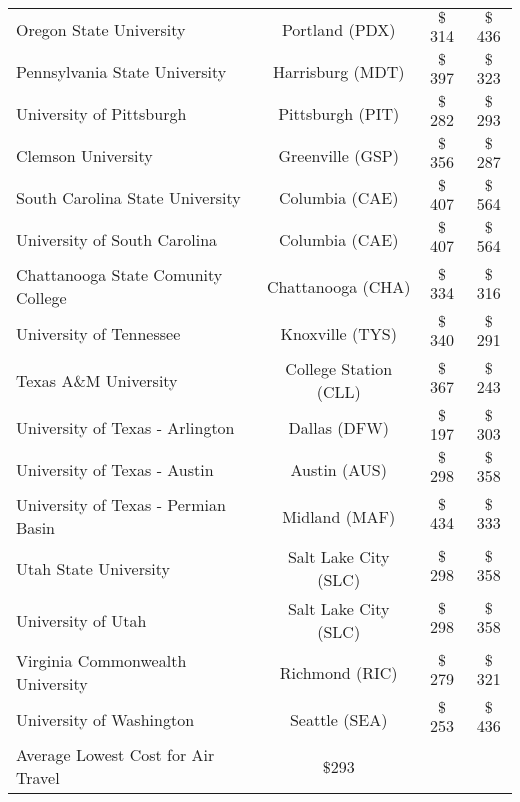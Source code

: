 \begin{center}
\begin{tabular}{lccc}
    Oregon State University &Portland (PDX) &$\$$314 &$\$$436 \\ 
    Pennsylvania State University & Harrisburg (MDT)&$\$$397 & $\$$323 \\
    University of Pittsburgh &Pittsburgh (PIT) &$\$$282 &$\$$293 \\ 
    Clemson University&Greenville (GSP)&$\$$356&$\$$287\\
    South Carolina State University&Columbia (CAE)&$\$$407 &$\$$564 \\ 
    University of South Carolina&Columbia (CAE)&$\$$407&$\$$564\\
    Chattanooga State Comunity College&Chattanooga (CHA)&$\$$334&$\$$316\\
    University of Tennessee&Knoxville (TYS)&$\$$340&$\$$291\\
    Texas A\&M University&College Station (CLL)&$\$$367&$\$$243\\
    University of Texas - Arlington&Dallas (DFW)&$\$$197&$\$$303\\
    University of Texas - Austin&Austin (AUS)&$\$$298&$\$$358\\
    University of Texas - Permian Basin&Midland (MAF)&$\$$434&$\$$333\\
    Utah State University&Salt Lake City (SLC)&$\$$298&$\$$358\\
    University of Utah&Salt Lake City (SLC)&$\$$298&$\$$358\\
    Virginia Commonwealth University&Richmond (RIC)&$\$$279&$\$$321\\
    University of Washington&Seattle (SEA)&$\$$253&$\$$436\\
    \hline
    Average Lowest Cost for Air Travel&$\$$293&&
    
    \end{tabular} 


\end{center}
